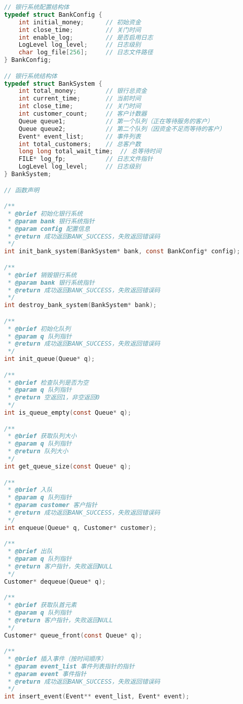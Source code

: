 \documentclass[12pt,a4paper]{article}
\begin{document}
\begin{lstlisting}[language=C,caption=bank\_simulation.h]
// 银行系统配置结构体
typedef struct BankConfig {
    int initial_money;      // 初始资金
    int close_time;         // 关门时间
    int enable_log;         // 是否启用日志
    LogLevel log_level;     // 日志级别
    char log_file[256];     // 日志文件路径
} BankConfig;

// 银行系统结构体
typedef struct BankSystem {
    int total_money;        // 银行总资金
    int current_time;       // 当前时间
    int close_time;         // 关门时间
    int customer_count;     // 客户计数器
    Queue queue1;           // 第一个队列（正在等待服务的客户）
    Queue queue2;           // 第二个队列（因资金不足而等待的客户）
    Event* event_list;      // 事件列表
    int total_customers;    // 总客户数
    long long total_wait_time;  // 总等待时间
    FILE* log_fp;           // 日志文件指针
    LogLevel log_level;     // 日志级别
} BankSystem;

// 函数声明

/**
 * @brief 初始化银行系统
 * @param bank 银行系统指针
 * @param config 配置信息
 * @return 成功返回BANK_SUCCESS，失败返回错误码
 */
int init_bank_system(BankSystem* bank, const BankConfig* config);

/**
 * @brief 销毁银行系统
 * @param bank 银行系统指针
 * @return 成功返回BANK_SUCCESS，失败返回错误码
 */
int destroy_bank_system(BankSystem* bank);

/**
 * @brief 初始化队列
 * @param q 队列指针
 * @return 成功返回BANK_SUCCESS，失败返回错误码
 */
int init_queue(Queue* q);

/**
 * @brief 检查队列是否为空
 * @param q 队列指针
 * @return 空返回1，非空返回0
 */
int is_queue_empty(const Queue* q);

/**
 * @brief 获取队列大小
 * @param q 队列指针
 * @return 队列大小
 */
int get_queue_size(const Queue* q);

/**
 * @brief 入队
 * @param q 队列指针
 * @param customer 客户指针
 * @return 成功返回BANK_SUCCESS，失败返回错误码
 */
int enqueue(Queue* q, Customer* customer);

/**
 * @brief 出队
 * @param q 队列指针
 * @return 客户指针，失败返回NULL
 */
Customer* dequeue(Queue* q);

/**
 * @brief 获取队首元素
 * @param q 队列指针
 * @return 客户指针，失败返回NULL
 */
Customer* queue_front(const Queue* q);

/**
 * @brief 插入事件（按时间顺序）
 * @param event_list 事件列表指针的指针
 * @param event 事件指针
 * @return 成功返回BANK_SUCCESS，失败返回错误码
 */
int insert_event(Event** event_list, Event* event);


\end{lstlisting}
\end{document}

